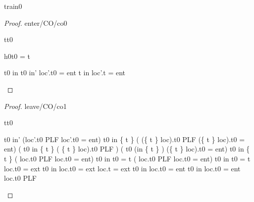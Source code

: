 \documentclass[12pt]{amsart}
\begin{document}
\begin{machine}{train0}
\begin{proof}{enter/CO/co0}
\begin{free:var}{t}{t0}
	\begin{by:cases}
	\begin{case}{h0}{t0 = t}
	\begin{calculation}
		\neg t0 \in in \land t0 \in in' \implies  loc'.t0 = ent 
	\hint{=}{ \eqref{h0} \ref{a1}  }
		\neg t \in in \implies  loc'.t = ent 
	\hint{=}{ \ref{a2} }
		\true
	\end{calculation}
	\end{case}
	\end{by:cases}
	\end{free:var}
\end{proof}

\begin{proof}{leave/CO/co1}
	\begin{free:var}{t}{t0}
	\begin{calculation}
		t0 \in in' \land (loc'.t0 \in PLF \lor loc'.t0 = ent)
		t0 \in in \setminus \{ t \} 
		\land ( (\{ t \} \domsub loc).t0 \in PLF \lor (\{ t \} \domsub loc).t0 = ent)
	\hint{=}{ }	%
		( t0 \in in \setminus \{ t \} 
		\land  ( \{ t \} \domsub loc).t0 \in PLF )
			   \lor ( t0 \in (in \setminus \{ t \} )
		\land (\{ t \} \domsub loc).t0 = ent)
	\hint{=}{ \ref{inv2} }	%
			t0 \in in \setminus \{ t \} 
		\land ( loc.t0 \in PLF \lor  loc.t0 = ent)
	\hint{=}{ } %
		t0 \in in \land \neg t0  = t 
		\land ( loc.t0 \in PLF \lor  loc.t0 = ent)
	\hint{=}{ \ref{asm2}, \ref{asm4}, \ref{asm3} } %
		t0 \in in \land \neg t0  = t \land \neg loc.t0 = ext
	\hint{=}{  \ref{grd0} } %
	 	t0 \in in \land \neg loc.t0 = ext \land loc.t = ext
	\hint{\follows}{  \ref{grd0}, \ref{asm2} } %
	 	t0 \in in \land loc.t0 = ent 
	\hint{=}{ \ref{asm2}  } %
	 	t0 \in in \land loc.t0 = ent  \land \neg loc.t0 \in PLF 
	\end{calculation}
	\end{free:var}
\end{proof}


\end{machine}
\end{document}
